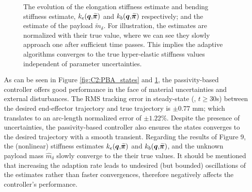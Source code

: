 {\begin{figure}[!t]
  \vspace{-3mm}
  \caption{The evolution of the elongation stiffness estimate and bending stiffness estimate, ${k}_e({\boldsymbol{q}},\widetilde{\!\boldsymbol{\pi}})$ and ${k}_b({\boldsymbol{q}},\widetilde{\!\boldsymbol{\pi}})$ respectively; and the estimate of the payload $\tilde{m}_\delta$. For illustration, the estimates are normalized with their true value, where we can see they slowly approach one after sufficient time passes. This implies the adaptive algorithms converges to the true hyper-elastic stiffness values independent of parameter uncertainties. \label{fig:C2:PBA_parameters}}
  \end{figure}
  \clearpage
}

%


As can be seen in Figure \ref{fig:C2:PBA_states} and \ref{fig:C2:PBA_parameters}, the passivity-based controller offers good performance in the face of material uncertainties and external disturbances. The RMS tracking error in steady-state (\ie, $t \ge 30$s) between the desired end-effector trajectory and true trajectory is $\pm0.77$ mm; which translates to an arc-length normalized error of $\pm1.22\%$. Despite the presence of uncertainties, the passivity-based controller also ensures the states converges to the desired trajectory with a smooth transient. Regarding the results of Figure 9, the (nonlinear) stiffness estimates ${k}_e({\boldsymbol{q}},\widetilde{\!\boldsymbol{\pi}})$ and $k_b({\boldsymbol{q}},\widetilde{\!\boldsymbol{\pi}})$, and the unknown payload mass $\hat{m}_\delta$ slowly converge to the their true values. It should be mentioned that increasing the adaption rate leads to undesired (but bounded) oscillations of the estimates rather than faster convergences, therefore negatively affects the controller's performance.
